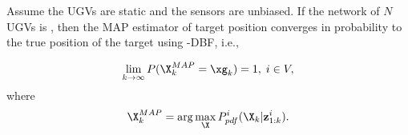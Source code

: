 	\begin{thm}\label{thm:\proto-dbf-sta-ugv}
		Assume the UGVs are static and the sensors are unbiased. If the network of $N$ UGVs is \fc, then the MAP estimator of target position converges in probability to the true position of the target using \proto-DBF, i.e.,
		
		\small\begin{equation*}
		\lim\limits_{k\rightarrow \infty}
		P(\X_k^{MAP}=\xg_k)=
		1,\;i\in V,
		\end{equation*}\normalsize
		where 
		\small\begin{equation*}
		\X_k^{MAP}=\arg\max\limits_{\X}P^i_{pdf}(\X_k|\mathbf{z}^{i}_{1:k}).
		\end{equation*}
		
	\end{thm}
	\medskip
	
